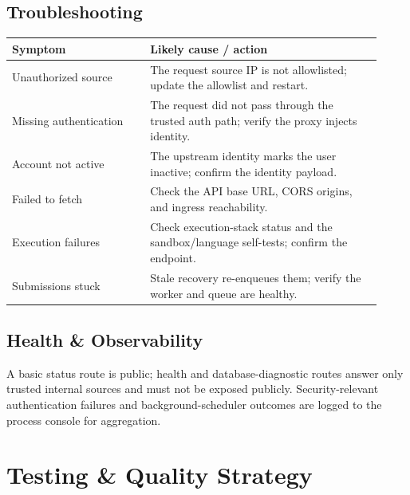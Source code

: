 \documentclass[12pt,a4paper,oneside]{report}
\begin{document}
\section{Troubleshooting}
\begin{longtable}{@{}p{0.34\linewidth} p{0.58\linewidth}@{}}
\toprule
\textbf{Symptom} & \textbf{Likely cause / action}\\
\midrule
\endhead
Unauthorized source & The request source IP is not allowlisted; update the allowlist and restart.\\
Missing authentication & The request did not pass through the trusted auth path; verify the proxy injects identity.\\
Account not active & The upstream identity marks the user inactive; confirm the identity payload.\\
Failed to fetch & Check the API base URL, CORS origins, and ingress reachability.\\
Execution failures & Check execution-stack status and the sandbox/language self-tests; confirm the endpoint.\\
Submissions stuck & Stale recovery re-enqueues them; verify the worker and queue are healthy.\\
\bottomrule
\end{longtable}

\section{Health \& Observability}
A basic status route is public; health and database-diagnostic routes answer only
trusted internal sources and must not be exposed publicly. Security-relevant
authentication failures and background-scheduler outcomes are logged to the
process console for aggregation.

\chapter{Testing \& Quality Strategy}
\end{document}
